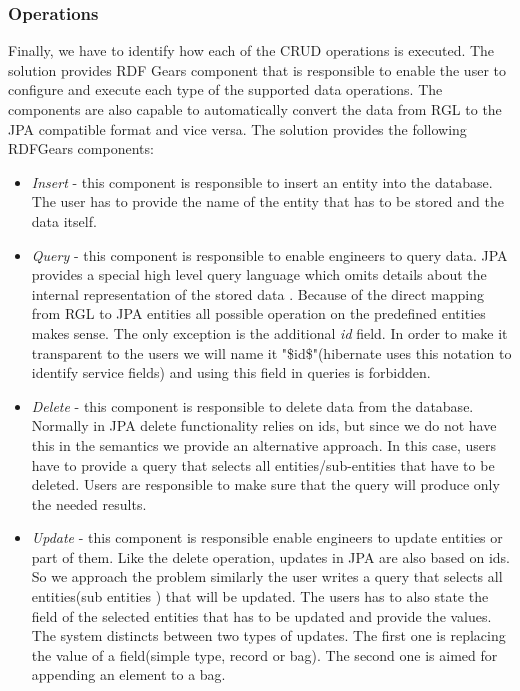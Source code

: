\documentclass[a4paper, notitlepage]{article}
\begin{document}
\subsubsection{Operations}
Finally, we have to identify how each of the CRUD operations is executed. The solution provides RDF Gears component that is responsible to enable the user to configure and execute each type of the supported data operations. The components are also capable to automatically convert the data from RGL to the JPA compatible format and vice versa. The solution provides the following RDFGears components:

\begin{itemize}
	\item \textit{Insert} - this component is responsible to insert an entity into the database. The user has to provide the name of the entity that has to be stored and the data itself.
	
	\item \textit{Query} - this component is responsible to enable engineers to query data. JPA provides a special high level query language which omits details about the internal representation of the stored data \cite{JPQL}. Because of the direct mapping from RGL to JPA entities all possible operation on the predefined entities makes sense. The only exception is the additional \textit{id} field. In order to make it transparent to the users we will name it "\$id\$"(hibernate uses this notation to identify service fields) and using this field in queries is forbidden.
	
	\item \textit{Delete} - this component is responsible to delete data from the database. Normally in JPA delete functionality relies on ids, but since we do not have this in the semantics we provide an alternative approach. In this case, users have to provide a query that selects all entities/sub-entities that have to be deleted. Users are responsible to make sure that the query will produce only the needed results.
	
	\item \textit{Update} - this component is responsible  enable engineers to update entities or part of them. Like the delete operation, updates in JPA are also based on ids. So we approach the problem similarly the user writes a query that selects all entities(sub entities ) that will be updated. The users has to also state the field of the selected entities that has to be updated and provide the values. The system distincts between two types of updates. The first one is replacing the value of a field(simple type, record or bag). The second one is aimed for appending an element to a bag.
\end{itemize}
\end{document}
